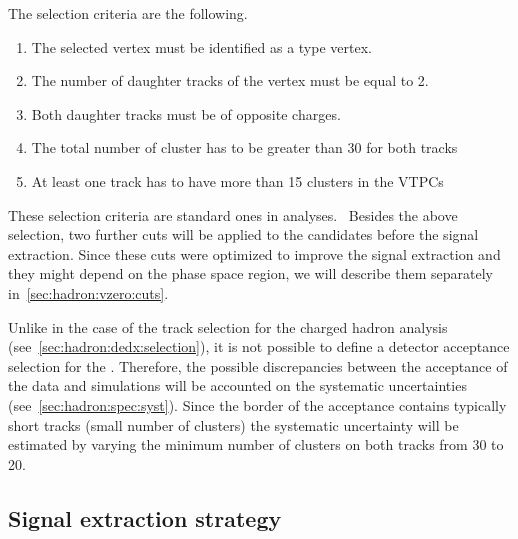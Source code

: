The \vzero selection criteria are the following.
\begin{enumerate}[label=(\roman*)]
\item The selected vertex must be identified as a \vzero type vertex.
\item The number of daughter tracks of the vertex must be equal to 2.
\item Both daughter tracks must be of opposite charges.
\item The total number of cluster has to be greater than 30 for both tracks
\item At least one track has to have more than 15 clusters in the VTPCs
\end{enumerate}
These selection criteria are standard ones
in \NASixtyOne analyses.~\cite{Aduszkiewicz:2015dmr,Abgrall:2015hmv}
Besides the above selection, two further \vzero cuts will be applied
to the \vzero candidates before the signal extraction. Since
these cuts were optimized to improve the signal extraction and they might
depend on the phase space region, we will describe them separately
in~\cref{sec:hadron:vzero:cuts}.

Unlike in the case of the track selection for the charged hadron
analysis (see~\cref{sec:hadron:dedx:selection}),
it is not possible to define a detector acceptance selection for
the \vzeros. Therefore, the possible discrepancies between
the acceptance of the data and simulations
will be accounted on the systematic uncertainties (see~\cref{sec:hadron:spec:syst}).
Since the border of the acceptance contains typically short tracks
(small number of clusters)
the systematic uncertainty will be estimated by varying the minimum number
of clusters on both tracks from 30 to 20. 

\subsection{Signal extraction strategy}
\label{sec:hadron:vzero:signal}

